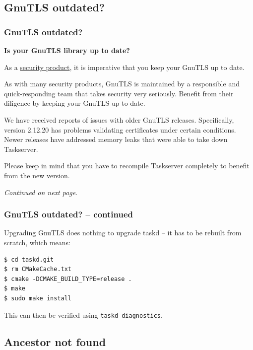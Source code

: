 \documentclass[t,handout]{beamer}
\begin{document}
\subsection{GnuTLS outdated?}

\begin{frame}[fragile]\frametitle{GnuTLS outdated?}\label{gnutlsproblem}
    \vfill
    \textbf{Is your GnuTLS library up to date?}

    As a \href{http://gnutls.org/security.html}{security product}, it is imperative that you keep your GnuTLS up to date.

    As with many security products, GnuTLS is maintained by a responsible and quick-responding team that takes security very seriously.  Benefit from their diligence by keeping your GnuTLS up to date.

    We have received reports of issues with older GnuTLS releases. Specifically, version 2.12.20 has problems validating certificates under certain conditions. Newer releases have addressed memory leaks that were able to take down Taskserver.

    Please keep in mind that you have to recompile Taskserver completely to benefit from the new version.

    \emph{Continued on next page}.
\end{frame}

\begin{frame}[fragile]\frametitle{GnuTLS outdated? -- continued}
    \vfill
    Upgrading GnuTLS does nothing to upgrade taskd -- it has to be rebuilt from scratch, which means:

    \begin{lstlisting}
$ cd taskd.git
$ rm CMakeCache.txt
$ cmake -DCMAKE_BUILD_TYPE=release .
$ make
$ sudo make install\end{lstlisting}

    This can then be verified using \verb+taskd diagnostics+.
\end{frame}

\subsection{Ancestor not found}
\end{document}
